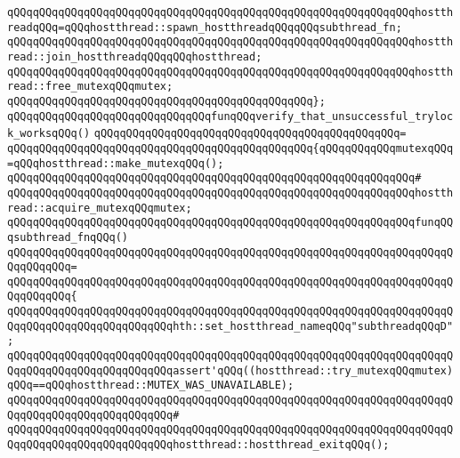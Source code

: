 \newline
\verb|qQQqqQQqqQQqqQQqqQQqqQQqqQQqqQQqqQQqqQQqqQQqqQQqqQQqqQQqqQQqqQQqhostthreadqQQq=qQQqhostthread::spawn_hostthreadqQQqqQQqsubthread_fn;|\newline
\newline
\verb|qQQqqQQqqQQqqQQqqQQqqQQqqQQqqQQqqQQqqQQqqQQqqQQqqQQqqQQqqQQqqQQqhostthread::join_hostthreadqQQqqQQqhostthread;|\newline
\newline
\verb|qQQqqQQqqQQqqQQqqQQqqQQqqQQqqQQqqQQqqQQqqQQqqQQqqQQqqQQqqQQqqQQqhostthread::free_mutexqQQqmutex;|\newline
\verb|qQQqqQQqqQQqqQQqqQQqqQQqqQQqqQQqqQQqqQQqqQQqqQQq};|\newline
\newline
\verb|qQQqqQQqqQQqqQQqqQQqqQQqqQQqqQQqfunqQQqverify_that_unsuccessful_trylock_worksqQQq()|\newline
\verb|qQQqqQQqqQQqqQQqqQQqqQQqqQQqqQQqqQQqqQQqqQQqqQQq=|\newline
\verb|qQQqqQQqqQQqqQQqqQQqqQQqqQQqqQQqqQQqqQQqqQQqqQQq{qQQqqQQqqQQqmutexqQQq=qQQqhostthread::make_mutexqQQq();|\newline
\verb|qQQqqQQqqQQqqQQqqQQqqQQqqQQqqQQqqQQqqQQqqQQqqQQqqQQqqQQqqQQqqQQq#|\newline
\verb|qQQqqQQqqQQqqQQqqQQqqQQqqQQqqQQqqQQqqQQqqQQqqQQqqQQqqQQqqQQqqQQqhostthread::acquire_mutexqQQqmutex;|\newline
\newline
\verb|qQQqqQQqqQQqqQQqqQQqqQQqqQQqqQQqqQQqqQQqqQQqqQQqqQQqqQQqqQQqqQQqfunqQQqsubthread_fnqQQq()|\newline
\verb|qQQqqQQqqQQqqQQqqQQqqQQqqQQqqQQqqQQqqQQqqQQqqQQqqQQqqQQqqQQqqQQqqQQqqQQqqQQqqQQq=|\newline
\verb|qQQqqQQqqQQqqQQqqQQqqQQqqQQqqQQqqQQqqQQqqQQqqQQqqQQqqQQqqQQqqQQqqQQqqQQqqQQqqQQq{|\newline
\verb|qQQqqQQqqQQqqQQqqQQqqQQqqQQqqQQqqQQqqQQqqQQqqQQqqQQqqQQqqQQqqQQqqQQqqQQqqQQqqQQqqQQqqQQqqQQqqQQqhth::set_hostthread_nameqQQq"subthreadqQQqD";|\newline
\newline
\verb|qQQqqQQqqQQqqQQqqQQqqQQqqQQqqQQqqQQqqQQqqQQqqQQqqQQqqQQqqQQqqQQqqQQqqQQqqQQqqQQqqQQqqQQqqQQqqQQqassert'qQQq((hostthread::try_mutexqQQqmutex)qQQq==qQQqhostthread::MUTEX_WAS_UNAVAILABLE);|\newline
\verb|qQQqqQQqqQQqqQQqqQQqqQQqqQQqqQQqqQQqqQQqqQQqqQQqqQQqqQQqqQQqqQQqqQQqqQQqqQQqqQQqqQQqqQQqqQQqqQQq#|\newline
\verb|qQQqqQQqqQQqqQQqqQQqqQQqqQQqqQQqqQQqqQQqqQQqqQQqqQQqqQQqqQQqqQQqqQQqqQQqqQQqqQQqqQQqqQQqqQQqqQQqhostthread::hostthread_exitqQQq();|\newline
